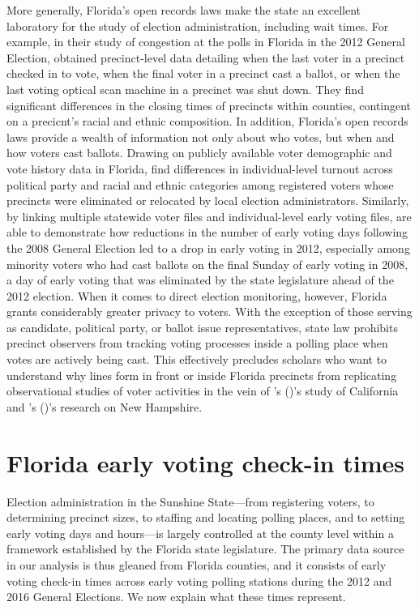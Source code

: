 \documentclass[12pt,titlepage]{article}
\newcommand{\possessivecite}[1]{\citeauthor{#1}'s (\citeyear{#1})}
\begin{document}
More generally, Florida's open records laws make the state an
excellent laboratory for the study of election administration,
including wait times. For example, in their study of congestion at the
polls in Florida in the 2012 General Election,
\cite{herronsmith:closingtimes} obtained precinct-level data detailing
when the last voter in a precinct checked in to vote, when the final
voter in a precinct cast a ballot, or when the last voting optical
scan machine in a precinct was shut down. They find significant
differences in the closing times of precincts within counties,
contingent on a precicnt's racial and ethnic composition.  In
addition, Florida's open records laws provide a wealth of information
not only about who votes, but when and how voters cast ballots.  Drawing 
on publicly available voter demographic and vote
history data in Florida, \cite{amos_etal2017} find differences in
individual-level turnout across political party and racial and ethnic
categories among registered voters whose precincts were eliminated or
relocated by local election administrators.  Similarly, by linking
multiple statewide voter files and individual-level early voting
files, \cite{herron_smith2014} are able to demonstrate how reductions
in the number of early voting days following the 2008 General Election
led to a drop in early voting in 2012, especially among minority
voters who had cast ballots on the final Sunday of early voting in
2008, a day of early voting that was eliminated by the state
legislature ahead of the 2012 election.  When it comes to direct
election monitoring, however, Florida grants considerably greater
privacy to voters.  With the exception of those serving as candidate,
political party, or ballot issue representatives, state law prohibits
precinct observers from tracking voting processes inside a polling
place when votes are actively being cast. This effectively precludes
scholars who want to understand why lines form in front or inside
Florida precincts from replicating observational studies of voter
activities in the vein of \possessivecite{spencermarkovits:renege}'s
study of California and \possessivecite{herronsmith:hanoverstudy}'s
research on New Hampshire.


\section*{Florida early voting check-in times}

Election administration in the Sunshine State---from registering
voters, to determining precinct sizes, to staffing and locating
polling places, and to setting early voting days and hours---is
largely controlled at the county level within a framework established
by the Florida state legislature. The primary data source in our
analysis is thus gleaned from Florida counties, and it consists of
early voting check-in times across early voting polling stations
during the 2012 and 2016 General Elections.  We now explain what these
times represent.
\end{document}
